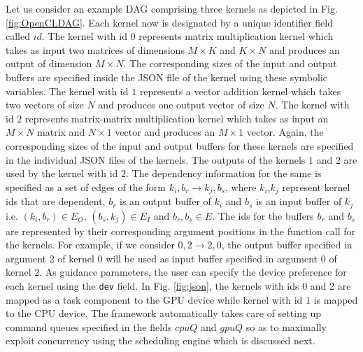     \par Let us consider an example DAG comprising three kernels as depicted in Fig. \ref{fig:OpenCLDAG}. Each kernel now is designated by a unique identifier field called $id$. The kernel with id $0$ represents matrix multiplication kernel which takes as input two matrices of dimensions $M \times K$ and $K \times N$ and produces an output of dimension $M \times N$. The corresponding sizes of the input and output buffers are specified inside the JSON file of the kernel using these symbolic variables. The kernel with id $1$ represents a vector addition kernel which takes two vectors of size $N$ and produces one output vector of size $N$. The kernel with id $2$ represents  matrix-matrix multiplication kernel which takes as input an $M\times N$ matrix and $N\times 1$ vector and produces an $M \times 1$ vector. Again, the corresponding sizes of the input and output buffers for these kernels are specified in the individual JSON files of the kernels. The outputs of the kernels $1$ and $2$ are used by the kernel with id $2$. The dependency information for the same is specified as a set of edges of the form $k_i,b_r \rightarrow k_j,b_s$, where $k_i$,$k_j$ represent kernel ids that are dependent, $b_r$ is an output buffer of $k_i$ and $b_s$ is an input buffer of $k_j$ i.e. $(k_i,b_r) \in E_O$, $(b_s,k_j) \in E_I$ and $b_r,b_s \in E$. The ids for the buffers $b_r$ and $b_s$ are represented by their corresponding argument positions in the function call for the kernels. For example, if we consider $0,2 \rightarrow 2, 0$, the output buffer specified in argument 2 of kernel $0$ will be used as input buffer specified in argument 0 of kernel $2$. As guidance parameters, the user can specify the device preference for each kernel using the {\tt dev} field. In Fig. \ref{fig:json}, the kernels with ids 0 and 2 are mapped as a task component to the GPU device while kernel with id $1$ is mapped to the CPU device. The framework automatically takes care of setting up command queues specified in the fields $cpuQ$ and $gpuQ$ so as to maximally exploit concurrency using the scheduling engine which is discussed next.
    

